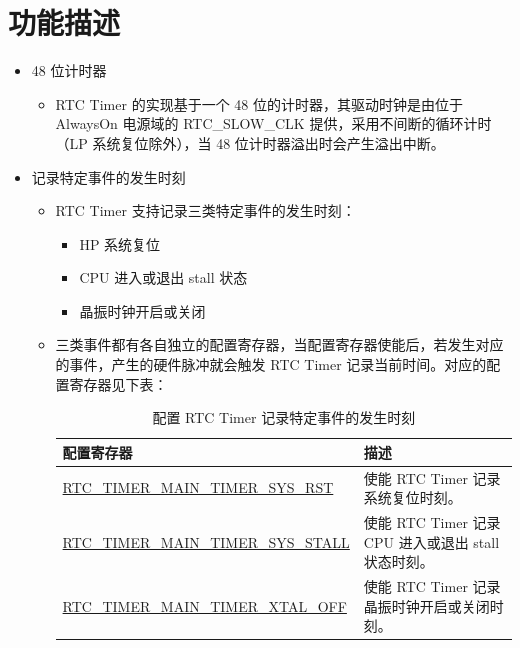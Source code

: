 \documentclass[main\_\_CN.tex]{subfiles}
\begin{document}

\section{功能描述}
\label{sec:rtctimer-func-descr}

\begin{itemize}
    \item 48 位计时器
    \begin{itemize}
        \item RTC Timer 的实现基于一个 48 位的计时器，其驱动时钟是由位于 Always\-On 电源域的 RTC\_SLOW\_CLK 提供，采用不间断的循环计时（LP 系统复位除外），当 48 位计时器溢出时会产生溢出中断。
    \end{itemize}

    \item 记录特定事件的发生时刻
    \begin{itemize}
        \item RTC Timer 支持记录三类特定事件的发生时刻：
        \begin{itemize}
            \item HP 系统复位
            \item CPU 进入或退出 stall 状态
            \item 晶振时钟开启或关闭
        \end{itemize}
        \item 三类事件都有各自独立的配置寄存器，当配置寄存器使能后，若发生对应的事件，产生的硬件脉冲就会触发 RTC Timer 记录当前时间。对应的配置寄存器见下表：
        \begin{longtable}[c]{|p{6cm}|p{9cm}|}
        \caption{配置 RTC Timer 记录特定事件的发生时刻} \label{tab:configure-rtc-timer-log-time-of-specific-events}
        \\\hline
        \rowcolor{lightgray}
        \textbf{配置寄存器} & \textbf{描述} \\
        \hline
        \hyperref[regdesc:RTCTIMERUPDATEREG]{RTC\_TIMER\_MAIN\_TIMER\_SYS\_RST} &  使能 RTC Timer 记录系统复位时刻。 \\
        \hline
        \hyperref[regdesc:RTCTIMERUPDATEREG]{RTC\_TIMER\_MAIN\_TIMER\_SYS\_STALL} &  使能 RTC Timer 记录 CPU 进入或退出 stall 状态时刻。\\
        \hline
        \hyperref[regdesc:RTCTIMERUPDATEREG]{RTC\_TIMER\_MAIN\_TIMER\_XTAL\_OFF} &  使能 RTC Timer 记录晶振时钟开启或关闭时刻。\\
        \hline
        \end{longtable}
    \end{itemize}



\end{itemize}
\end{document}
